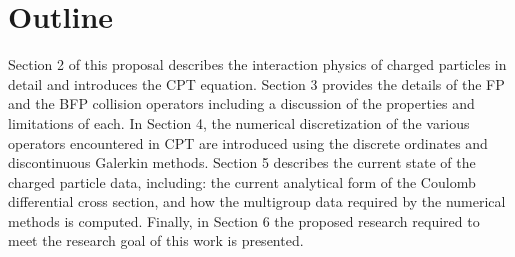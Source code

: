 \section{Outline}
Section 2 of this proposal describes the interaction physics of charged particles in detail and introduces the CPT equation. Section 3 provides the details of the FP and the BFP collision operators including a discussion of the properties and limitations of each. In Section 4, the numerical discretization of the various operators encountered in CPT are introduced using the discrete ordinates and discontinuous Galerkin methods. Section 5 describes the current state of the charged particle data, including: the current analytical form of the Coulomb differential cross section, and how the multigroup data required by the numerical methods is computed. Finally, in Section 6 the proposed research required to meet the research goal of this work is presented. 